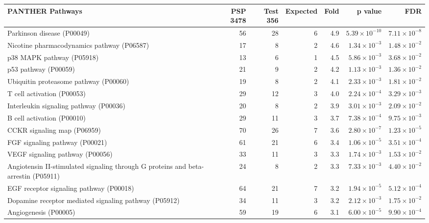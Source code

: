 \begin{table}[ht]
\centering
\begin{adjustbox}{width=\textwidth}
\begin{tabular}{lrrrrrr}
  \hline
PANTHER Pathways & PSP 3478 & Test 356 & Expected & Fold & p value & FDR \\ 
  \hline
Parkinson disease (P00049) & 56 & 28 & 6 & 4.9 & $5.39 \times 10^{-10}$ & $7.11 \times 10^{-8}$ \\ 
  Nicotine pharmacodynamics pathway (P06587) & 17 & 8 & 2 & 4.6 & $1.34 \times 10^{-3}$ & $1.48 \times 10^{-2}$ \\ 
  p38 MAPK pathway (P05918) & 13 & 6 & 1 & 4.5 & $5.86 \times 10^{-3}$ & $3.68 \times 10^{-2}$ \\ 
  p53 pathway (P00059) & 21 & 9 & 2 & 4.2 & $1.13 \times 10^{-3}$ & $1.36 \times 10^{-2}$ \\ 
  Ubiquitin proteasome pathway (P00060) & 19 & 8 & 2 & 4.1 & $2.33 \times 10^{-3}$ & $1.81 \times 10^{-2}$ \\ 
  T cell activation (P00053) & 29 & 12 & 3 & 4.0 & $2.24 \times 10^{-4}$ & $3.29 \times 10^{-3}$ \\ 
  Interleukin signaling pathway (P00036) & 20 & 8 & 2 & 3.9 & $3.01 \times 10^{-3}$ & $2.09 \times 10^{-2}$ \\ 
  B cell activation (P00010) & 29 & 11 & 3 & 3.7 & $7.38 \times 10^{-4}$ & $9.75 \times 10^{-3}$ \\ 
  CCKR signaling map (P06959) & 70 & 26 & 7 & 3.6 & $2.80 \times 10^{-7}$ & $1.23 \times 10^{-5}$ \\ 
  FGF signaling pathway (P00021) & 61 & 21 & 6 & 3.4 & $1.06 \times 10^{-5}$ & $3.51 \times 10^{-4}$ \\ 
  VEGF signaling pathway (P00056) & 33 & 11 & 3 & 3.3 & $1.74 \times 10^{-3}$ & $1.53 \times 10^{-2}$ \\ 
  Angiotensin II-stimulated signaling through G proteins and beta-arrestin (P05911) & 24 & 8 & 2 & 3.3 & $7.33 \times 10^{-3}$ & $4.40 \times 10^{-2}$ \\ 
  EGF receptor signaling pathway (P00018) & 64 & 21 & 7 & 3.2 & $1.94 \times 10^{-5}$ & $5.12 \times 10^{-4}$ \\ 
  Dopamine receptor mediated signaling pathway (P05912) & 34 & 11 & 3 & 3.2 & $2.12 \times 10^{-3}$ & $1.75 \times 10^{-2}$ \\ 
  Angiogenesis (P00005) & 59 & 19 & 6 & 3.1 & $6.00 \times 10^{-5}$ & $9.90 \times 10^{-4}$ \\ 

\end{tabular}
\end{adjustbox}
\end{table}
